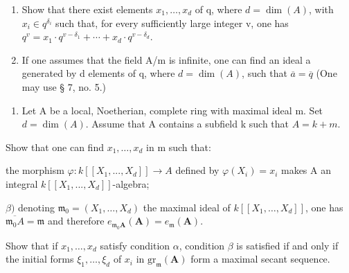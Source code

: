 \begin{enumerate}
\def\labelenumi{\alph{enumi})}
\tightlist
\item
  Show that there exist elements \(x_{1}, \ldots, x_{d}\) of q, where \(d = \dim(A)\), with \(x_{i} \in q^{\delta_{i}}\) such that, for every sufficiently large integer v, one has \(q^{v} = x_{1} \cdot q^{v - \delta_{1}} + \cdots + x_{d} \cdot q^{v - \delta_{d}}\).
\item
  If one assumes that the field A/m is infinite, one can find an ideal a generated by d elements of q, where \(d = \dim(A)\), such that \(\overline{a} = \overline{q}\) (One may use § 7, no. 5.)
\end{enumerate}

\begin{enumerate}
\def\labelenumi{\arabic{enumi})}
\setcounter{enumi}{14}
\tightlist
\item
  Let A be a local, Noetherian, complete ring with maximal ideal m. Set \(d = \dim(A)\). Assume that A contains a subfield k such that \(A = k + m\).
\end{enumerate}

Show that one can find \(x_{1},\ldots,x_{d}\) in m such that:

the morphism \(\varphi:k[[X_{1},...,X_{d}]]\to A\) defined by \(\varphi(X_{i})=x_{i}\) makes A an integral \(k[[X_{1},...,X_{d}]]\)-algebra;

\(\beta)\) denoting \(\mathfrak{m}_0 = (X_1, \ldots, X_d)\) the maximal ideal of \(k[[X_1, \ldots, X_d]]\), one has \(\overline{\mathfrak{m}_0A} = \mathfrak{m}\) and therefore \(e_{\mathfrak{m}_0\mathbf{A}}(\mathbf{A}) = e_{\mathfrak{m}}(\mathbf{A})\).

Show that if \(x_{1},\ldots,x_{d}\) satisfy condition \(\alpha\), condition \(\beta\) is satisfied if and only if the initial forms \(\xi_{1},\ldots,\xi_{d}\) of \(x_{i}\) in \(\mathrm{gr}_{\mathfrak{m}}(\mathbf{A})\) form a maximal secant sequence.


